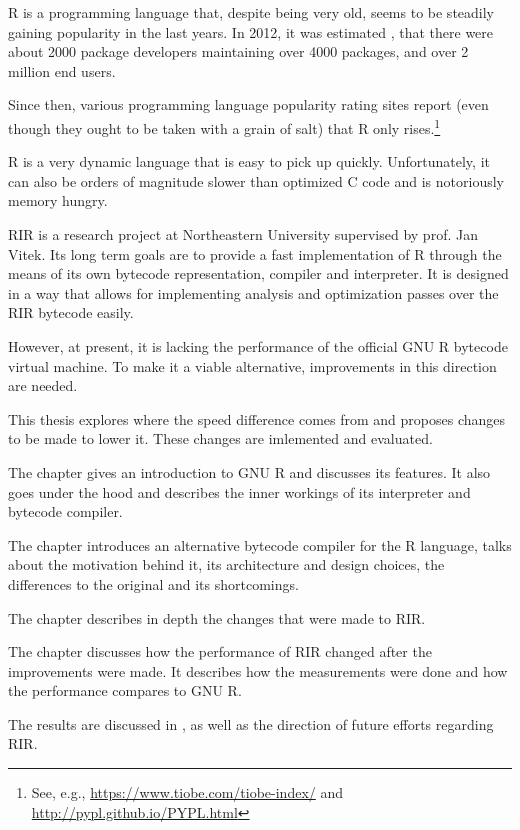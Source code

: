R is a programming language that, despite being very old, seems to be steadily gaining popularity in the last years. In 2012, it was estimated \autocite{design}, that there were about 2000 package developers maintaining over 4000 packages, and over 2 million end users.

Since then, various programming language popularity rating sites report (even though they ought to be taken with a grain of salt) that R only rises.\footnote{See, e.g., \url{https://www.tiobe.com/tiobe-index/} and \url{http://pypl.github.io/PYPL.html}}

R is a very dynamic language that is easy to pick up quickly. Unfortunately, it can also be orders of magnitude slower than optimized C code and is notoriously memory hungry.

RIR is a research project at Northeastern University supervised by prof. Jan Vitek. Its long term goals are to provide a fast implementation of R through the means of its own bytecode representation, compiler and interpreter. It is designed in a way that allows for implementing analysis and optimization passes over the RIR bytecode easily.

However, at present, it is lacking the performance of the official GNU R bytecode virtual machine. To make it a viable alternative, improvements in this direction are needed.

This thesis explores where the speed difference comes from and proposes changes to be made to lower it. These changes are imlemented and evaluated.

The chapter \emph{} gives an introduction to GNU R and discusses its features. It also goes under the hood and describes the inner workings of its interpreter and bytecode compiler.

The chapter \emph{} introduces an alternative bytecode compiler for the R language, talks about the motivation behind it, its architecture and design choices, the differences to the original and its shortcomings.

The chapter \emph{} describes in depth the changes that were made to RIR.

The chapter \emph{} discusses how the performance of RIR changed after the improvements were made. It describes how the measurements were done and how the performance compares to GNU R.

The results are discussed in \emph{}, as well as the direction of future efforts regarding RIR.

